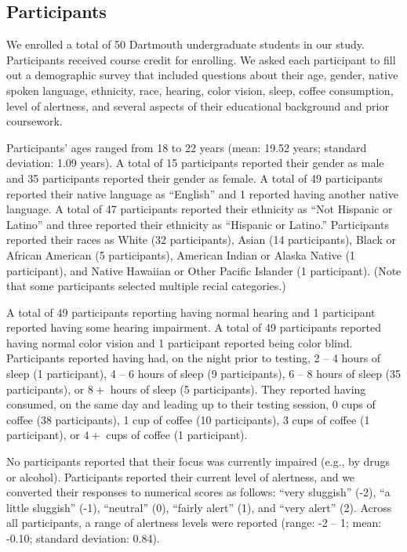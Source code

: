 \documentclass[10pt]{article}
\begin{document}
\subsection*{Participants}

We enrolled a total of 50 Dartmouth undergraduate students in our study.
Participants received course credit for enrolling. We asked each participant to
fill out a demographic survey that included questions about their age, gender,
native spoken language, ethnicity, race, hearing, color vision, sleep, coffee
consumption, level of alertness, and several aspects of their educational
background and prior coursework.

Participants' ages ranged from 18 to 22 years (mean: 19.52 years;
standard deviation: 1.09 years). A total of 15 participants reported
their gender as male and 35 participants reported their gender as
female. A total of 49 participants reported their native language as
``English'' and 1 reported having another native language. A total of
47 participants reported their ethnicity as ``Not Hispanic or Latino''
and three reported their ethnicity as ``Hispanic or Latino.''
Participants reported their races as White (32 participants), Asian
(14 participants), Black or African American (5 participants),
American Indian or Alaska Native (1 participant), and Native Hawaiian or
Other Pacific Islander (1 participant). (Note that some participants
selected multiple recial categories.)

A total of 49 participants reporting having normal hearing and 1
participant reported having some hearing impairment. A total of 49
participants reported having normal color vision and 1 participant
reported being color blind.  Participants reported having had, on the
night prior to testing, 2 -- 4 hours of sleep (1 participant), 4 -- 6
hours of sleep (9 participants), 6 -- 8 hours of sleep (35
participants), or $8+$ hours of sleep (5 participants). They reported
having consumed, on the same day and leading up to their testing
session, 0 cups of coffee (38 participants), 1 cup of coffee (10
participants), 3 cups of coffee (1 participant), or $4+$ cups of
coffee (1 participant).

No participants reported that their focus was currently impaired
(e.g., by drugs or alcohol).  Participants reported their current
level of alertness, and we converted their responses to numerical
scores as follows: ``very sluggish'' (-2), ``a little sluggish'' (-1),
``neutral'' (0), ``fairly alert'' (1), and ``very alert'' (2). Across
all participants, a range of alertness levels were reported (range: -2
-- 1; mean: -0.10; standard deviation: 0.84).
\end{document}
